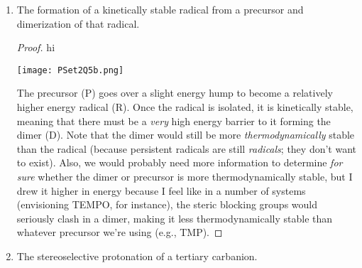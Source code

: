 \documentclass[../psets.tex]{subfiles}
\begin{document}
\begin{enumerate}
\begin{enumerate}
        \begin{proof}
            {\color{white}hi}
            \begin{center}
                \texttt{[image: PSet2Q5a.png]}
            \end{center}
            Draw the substrate at an arbitrary energy level. Since both reactions have equal rates, draw humps with equal $\Delta G^\ddagger$ to both sides of it, one for each reaction. Then curve the humps down to products at different energy levels.\par
            If I wanted a mixture of products (i.e., the kinetic products irreversibly formed through the energetically equivalent transition states), I would use  and \par
            If I wanted a single product (i.e., the thermodynamic product formed irreversibly along with a reversibly formed alternate product), I would use  and  It follows that I would expect the  product to be formed at the end.
        \end{proof}
        \item The formation of a kinetically stable radical from a precursor and dimerization of that radical.
        \begin{proof}
            {\color{white}hi}
            \begin{center}
                \texttt{[image: PSet2Q5b.png]}
            \end{center}
            The precursor (P) goes over a slight energy hump to become a relatively higher energy radical (R). Once the radical is isolated, it is kinetically stable, meaning that there must be a \emph{very} high energy barrier to it forming the dimer (D). Note that the dimer would still be more \emph{thermodynamically} stable than the radical (because persistent radicals are still \emph{radicals}; they don't want to exist). Also, we would probably need more information to determine \emph{for sure} whether the dimer or precursor is more thermodynamically stable, but I drew it higher in energy because I feel like in a number of systems (envisioning TEMPO, for instance), the steric blocking groups would seriously clash in a dimer, making it less thermodynamically stable than whatever precursor we're using (e.g., TMP).
        \end{proof}
        \item The stereoselective protonation of a tertiary carbanion.

\end{enumerate}
\end{enumerate}
\end{document}
